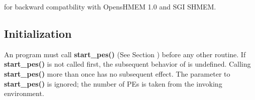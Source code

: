 for backward compatbility with OpensHMEM 1.0 and SGI SHMEM.

\subsection{Initialization}

An \openshmem program must call \textbf{start\_pes() }(See Section
) before any other \openshmem routine. If
\textbf{start\_pes()} is not called first, the subsequent behavior of
\openshmem is undefined.  Calling \textbf{start\_pes()} more than once
has no subsequent effect. The parameter to \textbf{start\_pes()} is
ignored; the number of PEs is taken from the invoking environment.
